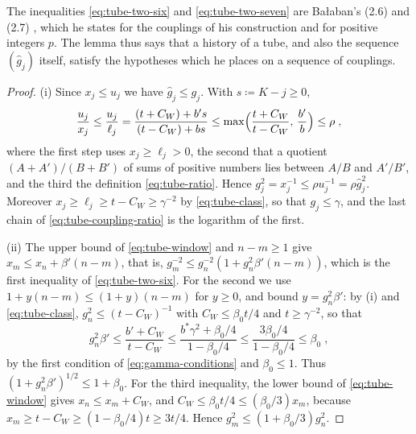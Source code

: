 \documentclass[11pt]{preprint}
\numberwithin{equation}{section}
\theoremstyle{definition}
\theoremstyle{remark}
\theoremstyle{plain}
\begin{document}
The inequalities \eqref{eq:tube-two-six} and \eqref{eq:tube-two-seven} are Ba{\l}aban's (2.6) and (2.7) \cite[p.~255]{BalabanCRE}, which he states for the couplings of his construction and for positive integers $p$. The lemma thus says that a history of a tube, and also the sequence $(\hat g_j)$ itself, satisfy the hypotheses which he places on a sequence of couplings.

\begin{proof}
(i) Since $x_j \leq u_j$ we have $\hat g_j \leq g_j$. With $s \coloneqq K - j \geq 0$,
\begin{equation}\label{eq:tube-mediant}
    \frac{u_j}{x_j} \leq \frac{u_j}{\ell_j} = \frac{(t + C_W) + b's}{(t - C_W) + bs} \leq \max\Bigl(\frac{t + C_W}{t - C_W},\, \frac{b'}{b}\Bigr) \leq \rho\;,
\end{equation}
where the first step uses $x_j \geq \ell_j > 0$, the second that a quotient $(A + A')/(B + B')$ of sums of positive numbers lies between $A/B$ and $A'/B'$, and the third the definition \eqref{eq:tube-ratio}. Hence $g_j^2 = x_j^{-1} \leq \rho u_j^{-1} = \rho\hat g_j^2$. Moreover $x_j \geq \ell_j \geq t - C_W \geq \gamma^{-2}$ by \eqref{eq:tube-class}, so that $g_j \leq \gamma$, and the last chain of \eqref{eq:tube-coupling-ratio} is the logarithm of the first.

(ii) The upper bound of \eqref{eq:tube-window} and $n - m \geq 1$ give $x_m \leq x_n + \beta'(n - m)$, that is, $g_m^{-2} \leq g_n^{-2}(1 + g_n^2\beta'(n - m))$, which is the first inequality of \eqref{eq:tube-two-six}. For the second we use $1 + y(n - m) \leq (1 + y)(n - m)$ for $y \geq 0$, and bound $y = g_n^2\beta'$: by (i) and \eqref{eq:tube-class}, $g_n^2 \leq (t - C_W)^{-1}$ with $C_W \leq \beta_0t/4$ and $t \geq \gamma^{-2}$, so that
\begin{equation}\label{eq:tube-beta-prime}
    g_n^2\beta' \leq \frac{b' + C_W}{t - C_W} \leq \frac{b^*\gamma^2 + \beta_0/4}{1 - \beta_0/4} \leq \frac{3\beta_0/4}{1 - \beta_0/4} \leq \beta_0\;,
\end{equation}
by the first condition of \eqref{eq:gamma-conditions} and $\beta_0 \leq 1$. Thus $(1 + g_n^2\beta')^{1/2} \leq 1 + \beta_0$. For the third inequality, the lower bound of \eqref{eq:tube-window} gives $x_n \leq x_m + C_W$, and $C_W \leq \beta_0t/4 \leq (\beta_0/3)x_m$, because $x_m \geq t - C_W \geq (1 - \beta_0/4)t \geq 3t/4$. Hence $g_m^2 \leq (1 + \beta_0/3)g_n^2$.


\end{proof}
\end{document}
